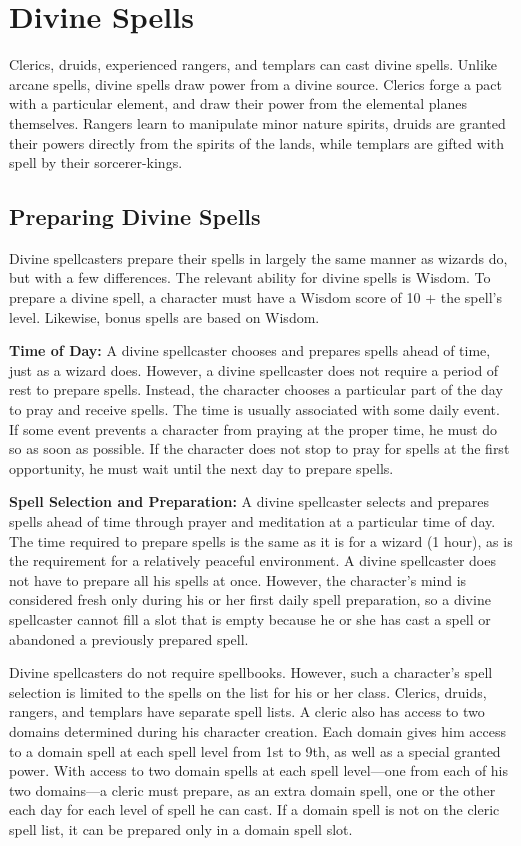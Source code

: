 \section{Divine Spells}
Clerics, druids, experienced rangers, and templars can cast divine spells. Unlike arcane spells, divine spells draw power from a divine source. Clerics forge a pact with a particular element, and draw their power from the elemental planes themselves. Rangers learn to manipulate minor nature spirits, druids are granted their powers directly from the spirits of the lands, while templars are gifted with spell by their sorcerer-kings.

\subsection{Preparing Divine Spells}
Divine spellcasters prepare their spells in largely the same manner as wizards do, but with a few differences. The relevant ability for divine spells is Wisdom. To prepare a divine spell, a character must have a Wisdom score of 10 + the spell's level. Likewise, bonus spells are based on Wisdom.


\textbf{Time of Day:} A divine spellcaster chooses and prepares spells ahead of time, just as a wizard does. However, a divine spellcaster does not require a period of rest to prepare spells. Instead, the character chooses a particular part of the day to pray and receive spells. The time is usually associated with some daily event. If some event prevents a character from praying at the proper time, he must do so as soon as possible. If the character does not stop to pray for spells at the first opportunity, he must wait until the next day to prepare spells.

\textbf{Spell Selection and Preparation:} A divine spellcaster selects and prepares spells ahead of time through prayer and meditation at a particular time of day. The time required to prepare spells is the same as it is for a wizard (1 hour), as is the requirement for a relatively peaceful environment. A divine spellcaster does not have to prepare all his spells at once. However, the character's mind is considered fresh only during his or her first daily spell preparation, so a divine spellcaster cannot fill a slot that is empty because he or she has cast a spell or abandoned a previously prepared spell.

Divine spellcasters do not require spellbooks. However, such a character's spell selection is limited to the spells on the list for his or her class. Clerics, druids, rangers, and templars have separate spell lists. A cleric also has access to two domains determined during his character creation. Each domain gives him access to a domain spell at each spell level from 1st to 9th, as well as a special granted power. With access to two domain spells at each spell level---one from each of his two domains---a cleric must prepare, as an extra domain spell, one or the other each day for each level of spell he can cast. If a domain spell is not on the cleric spell list, it can be prepared only in a domain spell slot.

